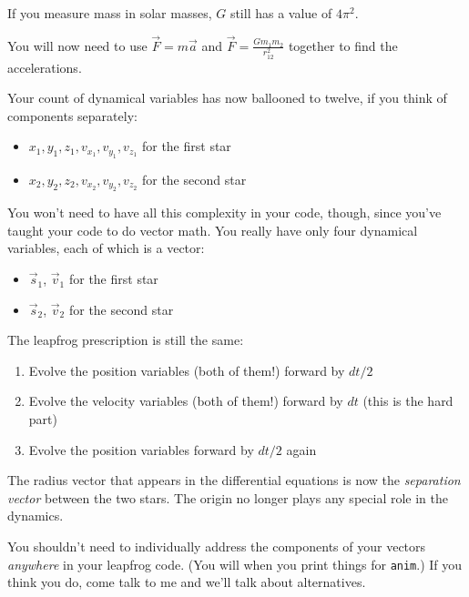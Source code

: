 \documentclass[12pt]{article}
\begin{document}
\begin{enumerate}
    \begin{itemize}
      \item{If you measure mass in solar masses, $G$ still has a value of $4\pi^2$.}
      \item{You will now need to use $\vec F=m\vec a$ and $\vec F=\frac{Gm_1m_2}{r_{12}^2}$
             together to find the accelerations.}
      \item{Your count of dynamical variables has now ballooned to twelve, if you think of components separately:
          \begin{itemize}
            \item{$x_1, y_1, z_1, v_{x_1}, v_{y_1}, v_{z_1}$ for the first star}
            \item{$x_2, y_2, z_2, v_{x_2}, v_{y_2}, v_{z_2}$ for the second star}
          \end{itemize}
      \item You won't need to have all this complexity in your code, though, since you've taught your code to do vector math. You really have only four dynamical variables, each of which is a vector:
           \begin{itemize}
             \item {$\vec s_1$, $\vec v_1$ for the first star}
             \item {$\vec s_2$, $\vec v_2$ for the second star}
           \end{itemize}
       }
     \item {
          The leapfrog prescription is still the same: 
            \begin{enumerate}
              \item Evolve the position variables (both of them!) forward by $dt/2$
              \item Evolve the velocity variables (both of them!) forward by $dt$ (this is the hard part)
              \item Evolve the position variables forward by $dt/2$ again
            \end{enumerate}
          }
  
      \item{The radius vector that appears in the differential equations is now the {\it separation vector} between the two stars. The origin no longer plays any special role in the dynamics.}
      \item{You shouldn't need to individually address the components of your vectors {\it anywhere} in your leapfrog code. (You will when you print things for {\tt anim}.) If you think you do, come talk to me and we'll talk about alternatives.}
    \end{itemize}


\end{enumerate}
\end{document}

